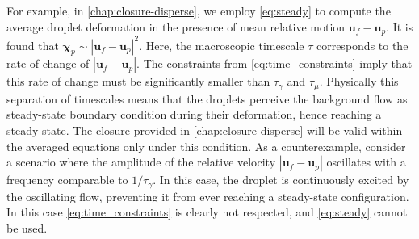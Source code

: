 For example, in \ref{chap:closure-disperse}, we employ \ref{eq:steady} to compute the average droplet deformation in the presence of mean relative motion $\textbf{u}_f-\textbf{u}_p$. 
It is found that $\bm\chi_p \sim |\textbf{u}_f-\textbf{u}_p|^2$. 
Here, the macroscopic timescale $\tau$ corresponds to the rate of change of $|\textbf{u}_f-\textbf{u}_p|$.  
The constraints from \ref{eq:time_constraints} imply that this rate of change must be significantly smaller than $\tau_\gamma$ and $\tau_\mu$. 
Physically this separation of timescales means that the droplets perceive the background flow as steady-state boundary condition during their deformation, hence reaching a steady state.
The closure provided in  \ref{chap:closure-disperse} will be valid within the averaged equations only under this condition.  
As a counterexample, consider a scenario where the amplitude of the relative velocity $|\textbf{u}_f-\textbf{u}_p|$ oscillates with a frequency comparable to $1/\tau_\gamma$. 
In this case, the droplet is continuously excited by the oscillating flow, preventing it from ever reaching a steady-state configuration. 
In this case \ref{eq:time_constraints} is clearly not respected, and \ref{eq:steady} cannot be used. 


